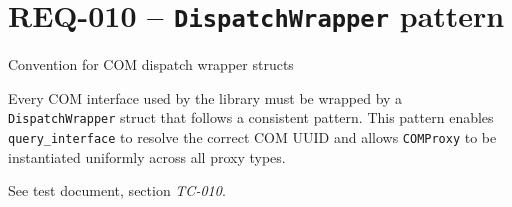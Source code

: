 \section{REQ-010 -- \texttt{DispatchWrapper} pattern}
\label{sec:dispatchwrapper}

 Convention for COM dispatch wrapper structs 

\medskip
{}
Every COM interface used by the library must be wrapped by a \texttt{DispatchWrapper} struct that follows a consistent pattern. This pattern enables \texttt{query\_interface} to resolve the correct COM UUID and allows \texttt{COMProxy} to be instantiated uniformly across all proxy types.

\medskip
{}

\medskip
{}
See test document, section \textit{TC-010}.